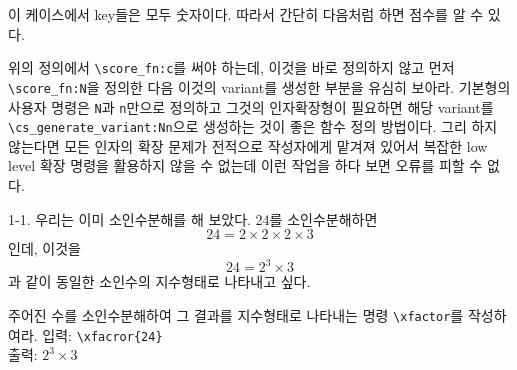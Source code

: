 \documentclass[a4paper,amsmath]{oblivoir}
\begin{document}
이 케이스에서 key들은 모두 숫자이다. 따라서 간단히 다음처럼 하면 점수를 알 수 있다.


위의 정의에서 \verb|\score_fn:c|를 써야 하는데, 이것을 바로 정의하지 않고
먼저 \verb|\score_fn:N|을 정의한 다음 이것의 variant를 생성한 부분을 유심히 보아라.
기본형의 사용자 명령은 \verb|N|과 \verb|n|만으로 정의하고 그것의 인자확장형이 필요하면
해당 variant를 \verb|\cs_generate_variant:Nn|으로 생성하는 것이 좋은 함수 정의 방법이다.
그리 하지 않는다면 모든 인자의 확장 문제가 전적으로 작성자에게 맡겨져 있어서 복잡한 low level
확장 명령을 활용하지 않을 수 없는데 이런 작업을 하다 보면 오류를 피할 수 없다.

\vfill

\begin{questionp}
 1-1. 우리는 이미 소인수분해를 해 보았다. 24를 소인수분해하면
\[
24 = 2\times 2\times 2\times 3
\]
인데, 이것을 
\[
24 = 2^3 \times 3
\]
과 같이 동일한 소인수의 지수형태로 나타내고 싶다.

주어진 수를 소인수분해하여 그 결과를 지수형태로 나타내는 명령 \verb|\xfactor|를 작성하여라.
\tcblower
입력: \verb|\xfacror{24}| \\
출력: $2^3 \times 3$
\end{questionp}
\end{document}
